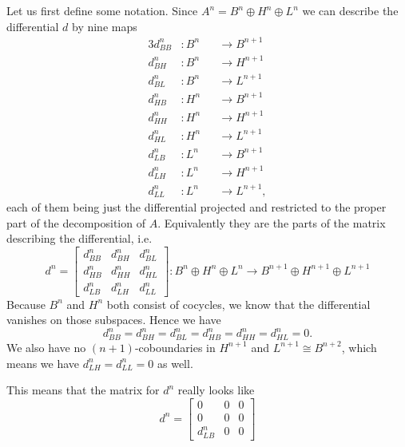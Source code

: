 Let us first define some notation. Since $A^n=B^n\oplus H^n\oplus L^n$ we can describe the differential $d$ by nine maps 
\begin{alignat*}{3}
    d^n_{BB}&\colon B^n &&\longrightarrow B^{n+1} \\
    d^n_{BH}&\colon B^n &&\longrightarrow H^{n+1} \\
    d^n_{BL}&\colon B^n &&\longrightarrow L^{n+1} \\
    d^n_{HB}&\colon H^n &&\longrightarrow B^{n+1} \\
    d^n_{HH}&\colon H^n &&\longrightarrow H^{n+1} \\
    d^n_{HL}&\colon H^n &&\longrightarrow L^{n+1} \\
    d^n_{LB}&\colon L^n &&\longrightarrow B^{n+1} \\
    d^n_{LH}&\colon L^n &&\longrightarrow H^{n+1} \\
    d^n_{LL}&\colon L^n &&\longrightarrow L^{n+1} , 
\end{alignat*}
each of them being just the differential projected and restricted to the proper part of the decomposition of $A$. Equivalently they are the parts of the matrix describing the differential, i.e. 
\begin{equation*}
d^n = 
\begin{bmatrix}
    d^n_{BB} & d^n_{BH} & d^n_{BL} \\
    d^n_{HB} & d^n_{HH} & d^n_{HL} \\
    d^n_{LB} & d^n_{LH} & d^n_{LL} 
\end{bmatrix}
\colon B^n\oplus H^n\oplus L^n \longrightarrow B^{n+1}\oplus H^{n+1}\oplus L^{n+1}
\end{equation*}
Because $B^n$ and $H^n$ both consist of cocycles, we know that the differential vanishes on those subspaces. Hence we have 
\begin{equation*}
    d^n_{BB} = d^n_{BH} = d^n_{BL} = d^n_{HB} = d^n_{HH} = d^n_{HL} = 0.
\end{equation*}
We also have no $(n+1)$-coboundaries in $H^{n+1}$ and $L^{n+1}\cong B^{n+2}$, which means we have $d^n_{LH} = d^n_{LL} = 0$ as well.

This means that the matrix for $d^n$ really looks like
\begin{equation*}
d^n = 
\begin{bmatrix}
    0 & 0 & 0 \\
    0 & 0 & 0 \\
    d^n_{LB} & 0 & 0 
\end{bmatrix}    
\end{equation*}

